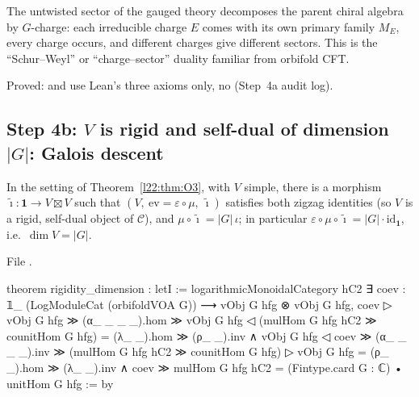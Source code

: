 \begin{physics}
The untwisted sector of the gauged theory decomposes the parent chiral algebra by $G$-charge: each irreducible charge
$E$ comes with its own primary family $M_E$, every charge occurs, and different charges give different sectors. This is
the ``Schur--Weyl'' or ``charge--sector'' duality familiar from orbifold CFT.
\end{physics}

\begin{status}
Proved:  and  use Lean's three axioms only, no  (Step~4a
audit log).
\end{status}

\subsection{Step 4b: \texorpdfstring{$V$}{V} is rigid and self-dual of dimension \texorpdfstring{$|G|$}{|G|}: Galois descent}

\begin{theorem}\label{l22:thm:O4b}
In the setting of Theorem~\ref{l22:thm:O3}, with $V$ simple, there is a morphism $\tilde\imath:\mathbf 1\to V\boxtimes V$
such that $(V,\ \mathrm{ev}=\varepsilon\circ\mu,\ \tilde\imath)$ satisfies both zigzag identities (so $V$ is a rigid,
self-dual object of $\mathcal C$), and $\mu\circ\tilde\imath=|G|\,\iota$; in particular $\varepsilon\circ\mu\circ\tilde\imath
=|G|\cdot\mathrm{id}_{\mathbf 1}$, i.e.\ $\dim V=|G|$.
\end{theorem}
\noindent File .
\begin{leancode}
theorem rigidity_dimension :
    letI := logarithmicMonoidalCategory hC2
    ∃ coev : 𝟙_ (LogModuleCat (orbifoldVOA G)) ⟶ vObj G hfg ⊗ vObj G hfg,
      coev ▷ vObj G hfg ≫ (α_ _ _ _).hom ≫ vObj G hfg ◁ (mulHom G hfg hC2 ≫ counitHom G hfg) =
          (λ_ _).hom ≫ (ρ_ _).inv ∧
        vObj G hfg ◁ coev ≫ (α_ _ _ _).inv ≫ (mulHom G hfg hC2 ≫ counitHom G hfg) ▷ vObj G hfg =
          (ρ_ _).hom ≫ (λ_ _).inv ∧
        coev ≫ mulHom G hfg hC2 = (Fintype.card G : ℂ) • unitHom G hfg := by
\end{leancode}

